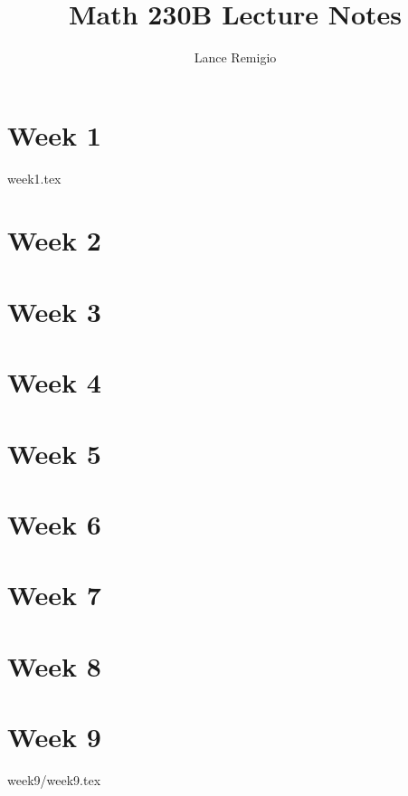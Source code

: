 \documentclass[a4paper]{book}
\title{Math 230B Lecture Notes}
\author{Lance Remigio}
\begin{document}
\maketitle

\chapter{Week 1}

{week1.tex}

\chapter{Week 2}



\chapter{Week 3}



\chapter{Week 4}



\chapter{Week 5}



\chapter{Week 6}



\chapter{Week 7}



\chapter{Week 8}



\chapter{Week 9}

{week9/week9.tex}
\end{document}
